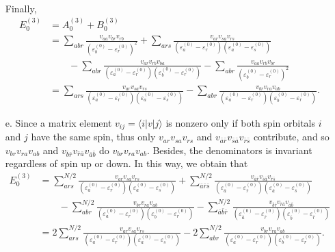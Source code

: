 \documentclass[a4paper]{book}
\newcounter{solution}[chapter]
\begin{document}
\begin{solution}
\begin{itemize}
\begin{align*}
	\end{align*}
	Finally,
	\begin{align*}
		E^{(3)}_0 &= A^{(3)}_0 + B^{(3)}_0 \\
		&= \sum_{abr} \frac{ v_{aa} v_{br} v_{rb} }{ ( \varepsilon^{(0)}_b - \varepsilon^{(0)}_r )^2} + \sum_{ ars } \frac{ v_{ar} v_{sa} v_{rs} }{ ( \varepsilon^{(0)}_a - \varepsilon^{(0)}_r)( \varepsilon^{(0)}_a - \varepsilon^{(0)}_s) } \\
		&\hspace{2em} - \sum_{ abr } \frac{ v_{ar} v_{rb} v_{ba} }{ ( \varepsilon^{(0)}_a - \varepsilon^{(0)}_r)( \varepsilon^{(0)}_b - \varepsilon^{(0)}_r) } - \sum_{abr} \frac{ v_{aa} v_{rb} v_{br}}{( \varepsilon^{(0)}_b - \varepsilon^{(0)}_r)^2} \\
		&= \sum_{ ars } \frac{ v_{ar} v_{sa} v_{rs} }{ ( \varepsilon^{(0)}_a - \varepsilon^{(0)}_r)( \varepsilon^{(0)}_a - \varepsilon^{(0)}_s) } - \sum_{ abr } \frac{ v_{br} v_{ra} v_{ab} }{ ( \varepsilon^{(0)}_a - \varepsilon^{(0)}_r)( \varepsilon^{(0)}_b - \varepsilon^{(0)}_r) } .
	\end{align*}
	
	\item[e.] Since a matrix element $v_{ij}=\langle i | v | j \rangle$ is nonzero only if both spin orbitals $i$ and $j$ have the same spin, thus only $v_{ar} v_{sa} v_{rs}$ and $v_{\bar{a}\bar{r}} v_{\bar{s} \bar{a}} v_{\bar{r} \bar{s}}$ contribute, and so $v_{br} v_{ra} v_{ab}$ and $v_{\bar{b}\bar{r}} v_{\bar{r} \bar{a}} v_{\bar{a} \bar{b}}$ do $v_{br} v_{ra} v_{ab}$. Besides, the denominators is invariant regardless of spin up or down. In this way, we obtain that
	\begin{align*}
		E^{(3)}_0 &= \sum_{ ars }^{N/2} \frac{ v_{ar} v_{sa} v_{rs} }{ ( \varepsilon^{(0)}_a - \varepsilon^{(0)}_r)( \varepsilon^{(0)}_a - \varepsilon^{(0)}_s) } + \sum_{ \bar{a} \bar{r} \bar{s} }^{N/2} \frac{ v_{\bar{a} \bar{r}} v_{\bar{s} \bar{a} } v_{ \bar{r} \bar{s}} }{ ( \varepsilon^{(0)}_{\bar{a}} - \varepsilon^{(0)}_{\bar{r}})( \varepsilon^{(0)}_{\bar{a}} - \varepsilon^{(0)}_{\bar{s}}) } \\
		&\hspace{2em} - \sum_{ abr }^{N/2} \frac{ v_{br} v_{ra} v_{ab} }{ ( \varepsilon^{(0)}_a - \varepsilon^{(0)}_r)( \varepsilon^{(0)}_b - \varepsilon^{(0)}_r) } - \sum_{ \bar{a} \bar{b} \bar{r} }^{N/2} \frac{ v_{\bar{b} \bar{r}} v_{\bar{r} \bar{a}} v_{\bar{a} \bar{b} } }{ ( \varepsilon^{(0)}_{\bar{a}} - \varepsilon^{(0)}_{\bar{r}})( \varepsilon^{(0)}_{\bar{b}} - \varepsilon^{(0)}_{\bar{r}}) } \\
		&= 2 \sum_{ ars }^{N/2} \frac{ v_{ar} v_{sa} v_{rs} }{ ( \varepsilon^{(0)}_a - \varepsilon^{(0)}_r)( \varepsilon^{(0)}_a - \varepsilon^{(0)}_s) } - 2 \sum_{ abr }^{N/2} \frac{ v_{br} v_{ra} v_{ab} }{ ( \varepsilon^{(0)}_a - \varepsilon^{(0)}_r)( \varepsilon^{(0)}_b - \varepsilon^{(0)}_r) }.
	\end{align*}
	
	\end{itemize}		
	
	\end{solution}
	
\end{document}
